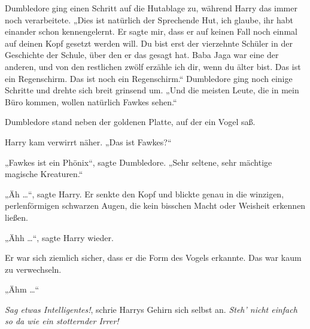 Dumbledore ging einen Schritt auf die Hutablage zu, während Harry das immer noch verarbeitete. „Dies ist natürlich der Sprechende Hut, ich glaube, ihr habt einander schon kennengelernt. Er sagte mir, dass er auf keinen Fall noch einmal auf deinen Kopf gesetzt werden will. Du bist erst der vierzehnte Schüler in der Geschichte der Schule, über den er das gesagt hat. Baba Jaga war eine der anderen, und von den restlichen zwölf erzähle ich dir, wenn du älter bist. Das ist ein Regenschirm. Das ist noch ein Regenschirm.“ Dumbledore ging noch einige Schritte und drehte sich breit grinsend um. „Und die meisten Leute, die in mein Büro kommen, wollen natürlich Fawkes sehen.“

Dumbledore stand neben der goldenen Platte, auf der ein Vogel saß.

Harry kam verwirrt näher. „Das ist Fawkes?“

„Fawkes ist ein Phönix“, sagte Dumbledore. „Sehr seltene, sehr mächtige magische Kreaturen.“

„Äh …“, sagte Harry. Er senkte den Kopf und blickte genau in die winzigen, perlenförmigen schwarzen Augen, die kein bisschen Macht oder Weisheit erkennen ließen.

„Ähh …“, sagte Harry wieder.

Er war sich ziemlich sicher, dass er die Form des Vogels erkannte. Das war kaum zu verwechseln.

„Ähm …“

\emph{Sag etwas Intelligentes!}, schrie Harrys Gehirn sich selbst an. \emph{Steh’ nicht einfach so da wie ein stotternder Irrer!}

